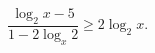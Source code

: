 \begin{ex}[type=inequality]
	\begin{condition}
		$ \dfrac{\log_2 x - 5}{1 - 2\log_x 2}\geqslant2\log_2 x .$
	\end{condition}
\end{ex}